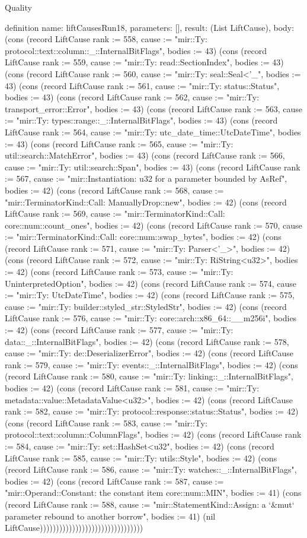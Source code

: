\begin{lexlean}{Quality}
\begin{semanticmodule}
definition{
  name: liftCausesRun18,
  parameters: [],
  result: (List LiftCause),
  body: (cons (record LiftCause {rank := 558, cause := "mir::Ty: protocol::text::column::_::InternalBitFlags", bodies := 43}) (cons (record LiftCause {rank := 559, cause := "mir::Ty: read::SectionIndex", bodies := 43}) (cons (record LiftCause {rank := 560, cause := "mir::Ty: seal::Seal<'_", bodies := 43}) (cons (record LiftCause {rank := 561, cause := "mir::Ty: status::Status", bodies := 43}) (cons (record LiftCause {rank := 562, cause := "mir::Ty: transport_error::Error", bodies := 43}) (cons (record LiftCause {rank := 563, cause := "mir::Ty: types::range::_::InternalBitFlags", bodies := 43}) (cons (record LiftCause {rank := 564, cause := "mir::Ty: utc_date_time::UtcDateTime", bodies := 43}) (cons (record LiftCause {rank := 565, cause := "mir::Ty: util::search::MatchError", bodies := 43}) (cons (record LiftCause {rank := 566, cause := "mir::Ty: util::search::Span", bodies := 43}) (cons (record LiftCause {rank := 567, cause := "mir::Instantiation: u32 for a parameter bounded by AsRef", bodies := 42}) (cons (record LiftCause {rank := 568, cause := "mir::TerminatorKind::Call: ManuallyDrop::new", bodies := 42}) (cons (record LiftCause {rank := 569, cause := "mir::TerminatorKind::Call: core::num::count_ones", bodies := 42}) (cons (record LiftCause {rank := 570, cause := "mir::TerminatorKind::Call: core::num::swap_bytes", bodies := 42}) (cons (record LiftCause {rank := 571, cause := "mir::Ty: Parser<'_>", bodies := 42}) (cons (record LiftCause {rank := 572, cause := "mir::Ty: RiString<u32>", bodies := 42}) (cons (record LiftCause {rank := 573, cause := "mir::Ty: UninterpretedOption", bodies := 42}) (cons (record LiftCause {rank := 574, cause := "mir::Ty: UtcDateTime", bodies := 42}) (cons (record LiftCause {rank := 575, cause := "mir::Ty: builder::styled_str::StyledStr", bodies := 42}) (cons (record LiftCause {rank := 576, cause := "mir::Ty: core::arch::x86_64::__m256i", bodies := 42}) (cons (record LiftCause {rank := 577, cause := "mir::Ty: data::_::InternalBitFlags", bodies := 42}) (cons (record LiftCause {rank := 578, cause := "mir::Ty: de::DeserializerError", bodies := 42}) (cons (record LiftCause {rank := 579, cause := "mir::Ty: events::_::InternalBitFlags", bodies := 42}) (cons (record LiftCause {rank := 580, cause := "mir::Ty: linking::_::InternalBitFlags", bodies := 42}) (cons (record LiftCause {rank := 581, cause := "mir::Ty: metadata::value::MetadataValue<u32>", bodies := 42}) (cons (record LiftCause {rank := 582, cause := "mir::Ty: protocol::response::status::Status", bodies := 42}) (cons (record LiftCause {rank := 583, cause := "mir::Ty: protocol::text::column::ColumnFlags", bodies := 42}) (cons (record LiftCause {rank := 584, cause := "mir::Ty: set::HashSet<u32", bodies := 42}) (cons (record LiftCause {rank := 585, cause := "mir::Ty: utils::Style", bodies := 42}) (cons (record LiftCause {rank := 586, cause := "mir::Ty: watches::_::InternalBitFlags", bodies := 42}) (cons (record LiftCause {rank := 587, cause := "mir::Operand::Constant: the constant item core::num::MIN", bodies := 41}) (cons (record LiftCause {rank := 588, cause := "mir::StatementKind::Assign: a `&mut` parameter rebound to another borrow", bodies := 41}) (nil LiftCause))))))))))))))))))))))))))))))))
}
\end{semanticmodule}
\end{lexlean}
